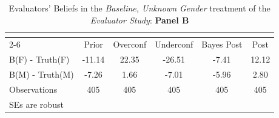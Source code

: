 \begin{table}[htbp]\centering
\caption{Evaluators' Beliefs in the \textit{Baseline, Unknown Gender} treatment of the \textit{Evaluator Study}: \textbf{Panel B}}
\begin{tabular}{l*{5}{c}}
\hline\hline
                &\multicolumn{5}{c}{}                             \\\cmidrule(lr){2-6}
                &\multicolumn{1}{c}{Prior}&\multicolumn{1}{c}{Overconf}&\multicolumn{1}{c}{Underconf}&\multicolumn{1}{c}{Bayes Post}&\multicolumn{1}{c}{Post}\\
\hline
B(F) - Truth(F) &   -11.14&    22.35&   -26.51&    -7.41&    12.12\\
B(M) - Truth(M) &    -7.26&     1.66&    -7.01&    -5.96&     2.80\\
\hline
Observations    &      405&      405&      405&      405&      405\\
\hline\hline
\multicolumn{6}{l}{\footnotesize SEs are robust}\\
\end{tabular}
\end{table}
